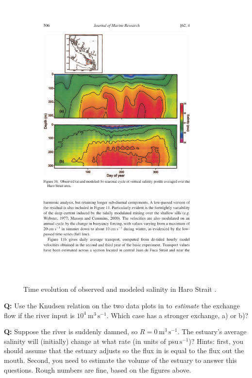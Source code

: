 \begin{figure}[htb]
  \centering
  \includegraphics[width=4in]{figs/MassonCummins04Fig10}
  \caption{Time evolution of observed and modeled salinity in Haro
    Strait \citep{massoncummins04}. }
  \label{fig:MassonCummins04Fig10}
\end{figure}

\textbf{Q:} Use the Knudsen relation on the two data plots in
 to \emph{estimate} the exchange flow if the
river input is $10^4\ \mathrm{m^3\,s^{-1}}$.  Which case has a
stronger exchange, a) or b)?

\textbf{Q:} Suppose the river is suddenly damned, so $R=0 \ \mathrm{m^3\,s^{-1}}$.  The estuary's average salinity will (initially) change at what rate (in units of $\mathrm{psu\,s^{-1}}$)?  Hints: first, you should assume that the estuary adjusts so the flux in is equal to the flux out the mouth.  Second, you need to estimate the volume of the estuary to answer this questions.  Rough numbers are fine, based on the figures above.

